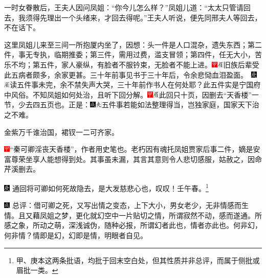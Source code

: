 一时女眷散后，王夫人因问凤姐：“你今儿怎么样？”凤姐儿道：“太太只管请回去，我须得先理出一个头绪来，才回去得呢。”王夫人听说，便先同邢夫人等回去，不在话下。

这里凤姐儿来至三间一所抱厦内坐了，因想：头一件是人口混杂，遗失东西；第二件，事无专执，临期推委；第三件，需用过费，滥支冒领；第四件，任无大小，苦乐不均；第五件，家人豪纵，有脸者不服钤束，无脸者不能上进。{\includegraphics[width=3mm]{../Images/00002}\includegraphics[width=3mm]{../Images/00010}\footnotesize \kaishu 旧族后辈受此五病者颇多，余家更甚。三十年前事见书于三十年后，令余悲恸血泪盈面。　\includegraphics[width=3mm]{../Images/00004}\includegraphics[width=3mm]{../Images/00010}\footnotesize \kaishu 读五件事未完，余不禁失声大哭，三十年前作书人在何处耶？}此五件实是宁国府中风俗。不知凤姐如何处治，且听下回分解。{\includegraphics[width=3mm]{../Images/00002}\includegraphics[width=3mm]{../Images/00010}\footnotesize \kaishu 此回只十页，因删去“天香楼”一节，少去四五页也。}正是：{\includegraphics[width=3mm]{../Images/00005}\includegraphics[width=3mm]{../Images/00012}\footnotesize \kaishu 五件事若能如法整理得当，岂独家庭，国家天下治之不难。}

金紫万千谁治国，裙钗一二可齐家。

{\includegraphics[width=3mm]{../Images/00002}“秦可卿淫丧天香楼”，作者用史笔也。老朽因有魂托凤姐贾家后事二件，嫡是安富尊荣坐享人能想得到处。其事虽未漏，其言其意则令人悲切感服，姑赦之，因命芹溪删去。}

{\includegraphics[width=3mm]{../Images/00004}  \kaishu 通回将可卿如何死故隐去，是大发慈悲心也，叹叹！壬午春。}\footnote{甲、庚本这两条批语，均批于回末空白处，但其性质并非总评，而属于侧批或眉批一类。}

{\includegraphics[width=3mm]{../Images/00005}  \kaishu 总评：借可卿之死，又写出情之变态，上下大小，男女老少，无非情感而生情。且又藉凤姐之梦，更化就幻空中一片贴切之情，所谓寂然不动，感而遂通。所感之象，所动之萌，深浅诚伪，随种必报，所谓幻者此也，情者亦此也。何非幻，何非情？情即是幻，幻即是情，明眼者自见。}